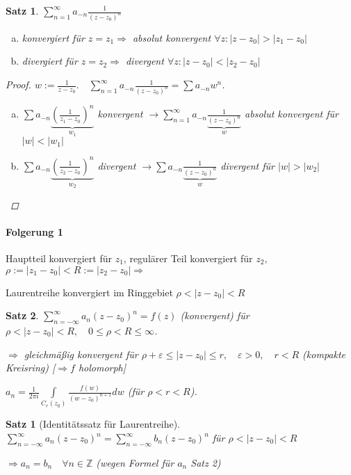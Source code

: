 \documentclass[ngerman,halfparskip]{scrartcl}
\newtheorem{satz}{Satz}[section]
\newtheorem*{satz*}{Satz}
\theoremstyle{definition}
\def\Z{\mathbb Z}
\begin{document}
\begin{satz}$\sum\limits_{n=1}^\infty a_{-n}\frac 1{(z-z_0)^n}$
\begin{enumerate}[a)]
\item konvergiert für $z=z_1 \Rightarrow$ absolut konvergent $\forall z: |z-z_0|>|z_1-z_0|$
\item divergiert für $z=z_2 \Rightarrow$ divergent $\forall z: |z-z_0|<|z_2-z_0|$
\end{enumerate}

\begin{proof}
$w:=\frac 1{z-z_0}. \quad \sum\limits_{n=1}^\infty a_{-n}\frac 1{(z-z_0)^n}=\sum a_{-n}w^n$.
\begin{enumerate}[a)]
\item $\sum a_{-n}\underbrace{\left(\frac 1{z_1-z_0} \right)^n}_{w_1}$ konvergent $\rightarrow \sum\limits_{n=1}^\infty a_{-n}\underbrace{\frac 1{(z-z_0)^n}}_{w}$ absolut konvergent für $|w|<|w_1|$
\item $\sum a_{-n}\underbrace{\left(\frac 1{z_2-z_0} \right)^n}_{w_2}$ divergent $\rightarrow \sum a_{-n}\underbrace{\frac 1{(z-z_0)^n}}_{w}$ divergent für $|w|>|w_2|$
\end{enumerate}
\end{proof}

\end{satz}

\paragraph*{Folgerung 1} Hauptteil konvergiert für $z_1$, regulärer Teil konvergiert für $z_2$, $\rho:=|z_1-z_0|<R:=|z_2-z_0| \Rightarrow$

Laurentreihe konvergiert im Ringgebiet $\rho<|z-z_0|<R$

\begin{satz}
$\sum\limits_{n=-\infty}^\infty a_{n}{(z-z_0)^n}=f(z)$ (konvergent) für $\rho < |z-z_0|<R, \quad 0\leq \rho<R\leq\infty$.

$\Rightarrow$ gleichmäßig konvergent für $\rho+\varepsilon\leq|z-z_0|\leq r, \quad \varepsilon>0, \quad r<R$ (kompakte Kreisring) [$\Rightarrow f$ holomorph]

$a_n=\frac 1 {2\pi i} \int\limits_{C_r(z_0)}\frac {f(w)}{(w-z_0)^{n+1}}dw$ (für $\rho<r<R$).
\end{satz}

\begin{satz*}[Identitätssatz für Laurentreihe] $\sum\limits_{n=-\infty}^\infty a_{n}{(z-z_0)^n}=\sum\limits_{n=-\infty}^\infty b_{n}{(z-z_0)^n}$ für $\rho<|z-z_0|<R$

$\Rightarrow a_n=b_n \quad \forall n\in\Z$ (wegen Formel für $a_n$ Satz 2)

\end{satz*}
\end{document}
